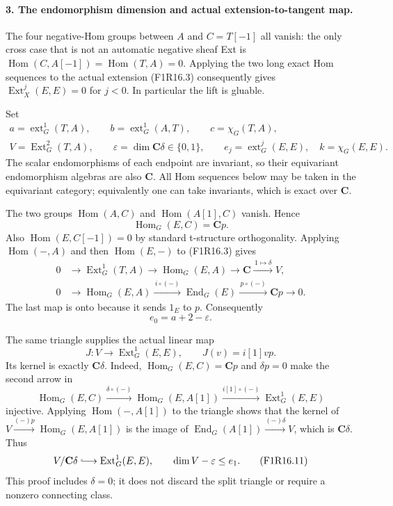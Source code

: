 \paragraph{3. The endomorphism dimension and actual extension-to-tangent map.}
The four negative-Hom groups between $A$ and $C=T[-1]$
all vanish: the only cross case that is not an automatic
negative sheaf Ext is
$\operatorname{Hom}(C,A[-1])=\operatorname{Hom}(T,A)=0$.
Applying the two long exact Hom sequences to the actual
extension (F1R16.3) consequently gives
$\operatorname{Ext}^j_X(E,E)=0$ for $j<0$. In particular
the lift is gluable.

Set
\[
 \begin{gathered}
 a=\operatorname{ext}^1_G(T,A),\qquad
 b=\operatorname{ext}^1_G(A,T),\qquad
 c=\chi_G(T,A),\\
 V=\operatorname{Ext}^2_G(T,A),\qquad
 \varepsilon=\dim\mathbf C\delta\in\{0,1\},\qquad
 e_j=\operatorname{ext}^j_G(E,E),\quad k=\chi_G(E,E).
 \end{gathered}
 \tag{F1R16.7}
\]
The scalar endomorphisms of each endpoint are invariant,
so their equivariant endomorphism algebras are also
$\mathbf C$. All Hom sequences below may be taken in
the equivariant category; equivalently one can take
invariants, which is exact over $\mathbf C$.

The two groups $\operatorname{Hom}(A,C)$ and
$\operatorname{Hom}(A[1],C)$ vanish. Hence
\[
                 \operatorname{Hom}_G(E,C)=\mathbf C p.
\]
Also $\operatorname{Hom}(E,C[-1])=0$ by standard
t-structure orthogonality. Applying $\operatorname{Hom}(-,A)$
and then $\operatorname{Hom}(E,-)$ to (F1R16.3) gives
\[
 \begin{split}
 0&\longrightarrow\operatorname{Ext}^1_G(T,A)
       \longrightarrow\operatorname{Hom}_G(E,A)
       \longrightarrow\mathbf C
       \xrightarrow{\,1\mapsto\delta\,} V,\\
 0&\longrightarrow\operatorname{Hom}_G(E,A)
       \xrightarrow{\,i\circ(-)\,}\operatorname{End}_G(E)
       \xrightarrow{\,p\circ(-)\,}\mathbf C p
       \longrightarrow0.
 \end{split}
 \tag{F1R16.8}
\]
The last map is onto because it sends $1_E$ to $p$.
Consequently
\[
                             e_0=a+2-\varepsilon.
 \tag{F1R16.9}
\]

The same triangle supplies the actual linear map
\[
 J:V\longrightarrow\operatorname{Ext}^1_G(E,E),
                       \qquad J(v)=i[1]vp.
 \tag{F1R16.10}
\]
Its kernel is exactly $\mathbf C\delta$. Indeed,
$\operatorname{Hom}_G(E,C)=\mathbf C p$ and
$\delta p=0$ make the second arrow in
\[
 \operatorname{Hom}_G(E,C)\xrightarrow{\delta\circ(-)}
 \operatorname{Hom}_G(E,A[1])\xrightarrow{i[1]\circ(-)}
 \operatorname{Ext}^1_G(E,E)
\]
injective. Applying $\operatorname{Hom}(-,A[1])$ to the
triangle shows that the kernel of
$V\xrightarrow{(-)p}\operatorname{Hom}_G(E,A[1])$
is the image of
$\operatorname{End}_G(A[1])\xrightarrow{(-)\delta}V$,
which is $\mathbf C\delta$. Thus
\[
                   V/\mathbf C\delta\lhook\joinrel\longrightarrow
                   \operatorname{Ext}^1_G(E,E),\qquad
                   \dim V-\varepsilon\le e_1.
 \tag{F1R16.11}
\]
This proof includes $\delta=0$; it does not discard the
split triangle or require a nonzero connecting class.

